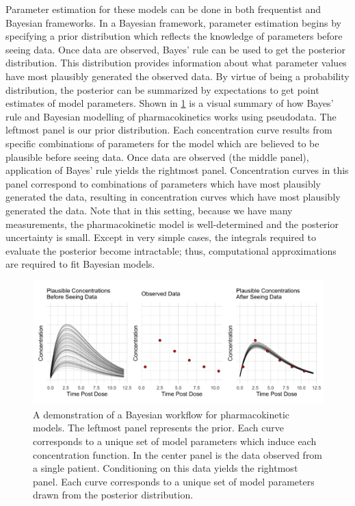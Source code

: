 Parameter estimation for these models can be done in both frequentist and Bayesian frameworks.  In a Bayesian framework, parameter estimation begins by specifying a prior distribution which reflects the knowledge of parameters before seeing data. Once data are observed, Bayes’ rule can be used to get the posterior distribution.  This distribution provides information about what parameter values have most plausibly generated the observed data.  By virtue of being a probability distribution, the posterior can be summarized by expectations to get point estimates of model parameters. Shown in \cref{fig:fig1} is a visual summary of how Bayes’ rule and Bayesian modelling of pharmacokinetics works using pseudodata. The leftmost panel is our prior distribution.  Each concentration curve results from specific combinations of parameters for the model which are believed to be plausible before seeing data.  Once data are observed (the middle panel), application of Bayes’ rule yields the rightmost panel.  Concentration curves in this panel correspond to combinations of parameters which have most plausibly generated the data, resulting in concentration curves which have most plausibly generated the data. Note that in this setting, because we have many measurements, the pharmacokinetic model is well-determined and the posterior uncertainty is small. Except in very simple cases, the integrals required to evaluate the posterior become intractable; thus, computational approximations are required to fit Bayesian models.
%
\begin{figure} [h!]
	\centering
	\includegraphics[width=\linewidth]{figs/fig_1}
	\caption{A demonstration of a Bayesian workflow for pharmacokinetic models.  The leftmost panel represents the prior.  Each curve corresponds to a unique set of model parameters which induce each concentration function.  In the center panel is the data observed from a single patient.  Conditioning on this data yields the rightmost panel.  Each curve corresponds to a unique set of model parameters drawn from the posterior distribution.} 
	\label{fig:fig1}
\end{figure}
%
